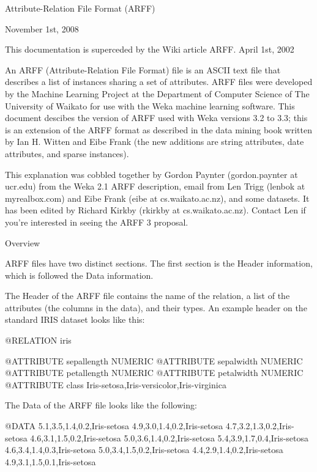 Attribute-Relation File Format (ARFF)

November 1st, 2008

This documentation is superceded by the Wiki article ARFF.
April 1st, 2002

An ARFF (Attribute-Relation File Format) file is an ASCII text file that describes a list of instances sharing a set of attributes. ARFF files were developed by the Machine Learning Project at the Department of Computer Science of The University of Waikato for use with the Weka machine learning software. This document descibes the version of ARFF used with Weka versions 3.2 to 3.3; this is an extension of the ARFF format as described in the data mining book written by Ian H. Witten and Eibe Frank (the new additions are string attributes, date attributes, and sparse instances).

This explanation was cobbled together by Gordon Paynter (gordon.paynter at ucr.edu) from the Weka 2.1 ARFF description, email from Len Trigg (lenbok at myrealbox.com) and Eibe Frank (eibe at cs.waikato.ac.nz), and some datasets. It has been edited by Richard Kirkby (rkirkby at cs.waikato.ac.nz). Contact Len if you're interested in seeing the ARFF 3 proposal.

Overview

ARFF files have two distinct sections. The first section is the Header information, which is followed the Data information.

The Header of the ARFF file contains the name of the relation, a list of the attributes (the columns in the data), and their types. An example header on the standard IRIS dataset looks like this:

   @RELATION iris

   @ATTRIBUTE sepallength  NUMERIC
   @ATTRIBUTE sepalwidth   NUMERIC
   @ATTRIBUTE petallength  NUMERIC
   @ATTRIBUTE petalwidth   NUMERIC
   @ATTRIBUTE class        {Iris-setosa,Iris-versicolor,Iris-virginica}
  
The Data of the ARFF file looks like the following:

   @DATA
   5.1,3.5,1.4,0.2,Iris-setosa
   4.9,3.0,1.4,0.2,Iris-setosa
   4.7,3.2,1.3,0.2,Iris-setosa
   4.6,3.1,1.5,0.2,Iris-setosa
   5.0,3.6,1.4,0.2,Iris-setosa
   5.4,3.9,1.7,0.4,Iris-setosa
   4.6,3.4,1.4,0.3,Iris-setosa
   5.0,3.4,1.5,0.2,Iris-setosa
   4.4,2.9,1.4,0.2,Iris-setosa
   4.9,3.1,1.5,0.1,Iris-setosa
  
